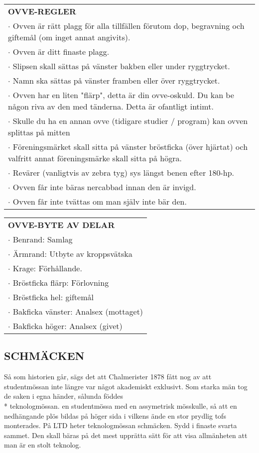 \begin{tabular}{p{\textwidth}}
    \textbf{OVVE-REGLER}\\
    $\cdot$ Ovven är rätt plagg för alla tillfällen förutom dop, begravning och giftemål (om inget annat angivits).\\
    $\cdot$ Ovven är ditt finaste plagg.\\
    $\cdot$ Slipsen skall sättas på vänster bakben eller under ryggtrycket.\\
    $\cdot$ Namn ska sättas på vänster framben eller över ryggtrycket.\\
    $\cdot$ Ovven har en liten "flärp", detta är din ovve-oskuld. Du kan be någon riva av den med tänderna. Detta är ofantligt intimt.\\
    $\cdot$ Skulle du ha en annan ovve (tidigare studier / program) kan ovven splittas på mitten\\
    $\cdot$ Föreningsmärket skall sitta på vänster bröstficka (över hjärtat) och valfritt annat föreningsmärke skall sitta på högra.\\
    $\cdot$ Revärer (vanligtvis av zebra tyg) sys längst benen efter 180-hp.\\
    $\cdot$ Ovven får inte bäras nercabbad innan den är invigd.\\
    $\cdot$ Ovven får inte tvättas om man själv inte bär den.\\
\end{tabular}
\begin{tabular}{p{\textwidth}}
    \textbf{OVVE-BYTE AV DELAR} \\
    $\cdot$ Benrand: Samlag\\
    $\cdot$ Ärmrand: Utbyte av kroppsvätska\\
    $\cdot$ Krage: Förhållande.\\
    $\cdot$ Bröstficka flärp: Förlovning \\
    $\cdot$ Bröstficka hel: giftemål\\
    $\cdot$ Bakficka vänster: Analsex (mottaget)\\
    $\cdot$ Bakficka höger: Analsex (givet)\\
\end{tabular}

\subsection*{\textbf{SCHMÄCKEN}}
Så som historien går, sägs det att Chalmerister 1878 fått nog av att studentmössan inte  längre var något akademiskt exklusivt.
Som starka män tog de saken i egna händer, sålunda föddes\\* teknologmössan. en studentmössa med en assymetrisk mösskulle, så att
en nedhängande plös bildas på höger sida i vilkens ände en stor prydlig tofs monterades. På LTD heter teknologmössan schmäcken. Sydd i finaste svarta sammet.
Den skall bäras på det mest upprätta sätt för att visa allmänheten att man är en stolt teknolog.


